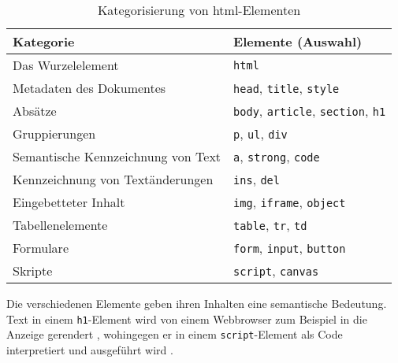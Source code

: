             \begin{table}[h]
                \centering
                \begin{tabular}{|l|l|}
                \hline
                \textbf{Kategorie} & \textbf{Elemente (Auswahl)} \\
                \hline
                Das Wurzelelement & \texttt{html} \\
                \hline
                Metadaten des Dokumentes & \texttt{head}, \texttt{title}, \texttt{style} \\
                \hline
                Absätze & \texttt{body}, \texttt{article}, \texttt{section}, \texttt{h1} \\
                \hline
                Gruppierungen & \texttt{p}, \texttt{ul}, \texttt{div} \\
                \hline
                Semantische Kennzeichnung von Text & \texttt{a}, \texttt{strong}, \texttt{code} \\
                \hline
                Kennzeichnung von Textänderungen & \texttt{ins}, \texttt{del} \\
                \hline
                Eingebetteter Inhalt & \texttt{img}, \texttt{iframe}, \texttt{object} \\
                \hline
                Tabellenelemente & \texttt{table}, \texttt{tr}, \texttt{td} \\
                \hline
                Formulare & \texttt{form}, \texttt{input}, \texttt{button} \\
                \hline
                Skripte & \texttt{script}, \texttt{canvas} \\
                \hline
                \end{tabular}
                \caption{Kategorisierung von \acrshort{html}-Elementen}
                \label{table:htmlElements}
            \end{table}

            Die verschiedenen Elemente geben ihren Inhalten eine semantische Bedeutung.
            Text in einem \texttt{h1}-Element wird von einem Webbrowser zum Beispiel in die Anzeige gerendert
            \cite[Kapitel 4.3.6]{w3c:html5},
            wohingegen er in einem \texttt{script}-Element als Code interpretiert und ausgeführt wird
            \cite[Kapitel 4.11.1]{w3c:html5}.
        
